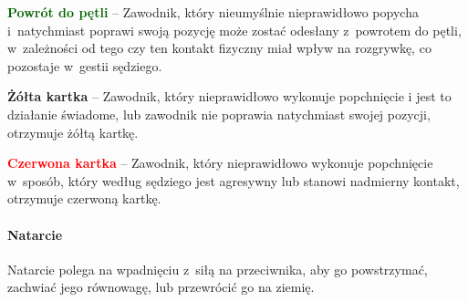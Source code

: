 \documentclass[12pt]{article}
\newcommand\redcard[1]{\bgroup\textcolor{red}{\textbf{#1}}}
\newcommand\yellowcard[1]{\bgroup\textcolor{darkyellow}{\textbf{#1}}}
\newcommand\other[1]{\bgroup\textcolor{darkgreen}{\textbf{#1}}}
\begin{document}
\other{Powrót do pętli} -- Zawodnik, który nieumyślnie nieprawidłowo
popycha i~natychmiast poprawi swoją pozycję może zostać odesłany z~powrotem do pętli, w~zależności od tego czy ten kontakt fizyczny miał
wpływ na rozgrywkę, co pozostaje w~gestii sędziego.

\yellowcard{Żółta kartka} -- Zawodnik, który nieprawidłowo wykonuje popchnięcie
i jest to działanie świadome, lub zawodnik nie poprawia natychmiast
swojej pozycji, otrzymuje żółtą kartkę.

\redcard{Czerwona kartka} -- Zawodnik, który nieprawidłowo wykonuje
popchnięcie w~sposób, który według sędziego jest agresywny lub stanowi
nadmierny kontakt, otrzymuje czerwoną kartkę.

\paragraph{Natarcie}
Natarcie polega na wpadnięciu z~siłą na
przeciwnika, aby go powstrzymać, zachwiać jego równowagę, lub przewrócić
go na ziemię.
\end{document}
